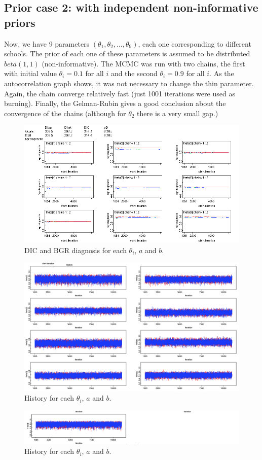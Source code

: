 \documentclass{article}
\begin{document}
\newpage
\subsection{Prior case 2: with independent non-informative priors}
Now, we have 9 parameters $(\theta_1, \theta_2, ..., \theta_9)$, each one corresponding to different schools. The prior of each one of these parameters is assumed to be distributed $beta(1,1)$ (non-informative). The MCMC was run with two chains, the first with initial value $\theta_i = 0.1$ for all $i$ and the second $\theta_i = 0.9$ for all $i$. As the autocorrelation graph shows, it was not necessary to change the thin parameter. Again, the chain converge relatively fast (just 1001 iterations were used as burning). Finally, the Gelman-Rubin gives a good conclusion about the convergence of the chains (although for $\theta_2$ there is a very small gap.)

  \begin{figure}[ht!]
  \centering
  \includegraphics[width=.8\textwidth]{imgs/M2_1.png}
  \caption{DIC and BGR diagnosis for each $\theta_i$, $a$ and $b$. }
  \label{fig:fig2}
  \end{figure}
  
  \begin{figure}[ht!]
  \centering
  \includegraphics[width=.8\textwidth]{imgs/M2_2.png}
  \caption{History for each $\theta_i$, $a$ and $b$.}
  \label{fig:fig3}
  \end{figure}
  \begin{figure}[ht!]
  \centering
  \includegraphics[width=.8\textwidth]{imgs/M2_3.png}
  \caption{History for each $\theta_i$, $a$ and $b$. }
  \label{fig:fig4}
  \end{figure}
  
\end{document}
